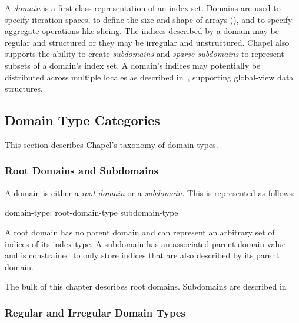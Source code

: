 \label{Domains}

A \emph{domain} is a first-class representation of an index set.
Domains are used to specify iteration spaces, to define the size and
shape of arrays (), and to specify aggregate operations
like slicing.  The indices described by a domain may be regular and
structured or they may be irregular and unstructured.  Chapel also
supports the ability to create \emph{subdomains} and \emph{sparse
subdomains} to represent subsets of a domain's index set.  A domain's
indices may potentially be distributed across multiple locales as
described in~, supporting global-view data
structures.


\subsection{Domain Type Categories}
\label{Domain_Type_Categories}

This section describes Chapel's taxonomy of domain types.

\subsubsection{Root Domains and Subdomains}


A domain is either a \emph{root domain} or a \emph{subdomain}.  This
is represented as follows:

\begin{syntax}
domain-type:
  root-domain-type
  subdomain-type
\end{syntax}

 \noindent A root domain has no parent domain and can represent an
arbitrary set of indices of its index type.  A subdomain has an
associated parent domain value and is constrained to only store
indices that are also described by its parent domain.

The bulk of this chapter describes root domains.  Subdomains are
described in ~


\subsubsection{Regular and Irregular Domain Types}

